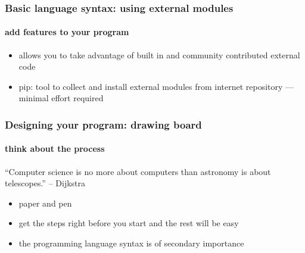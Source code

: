 \documentclass{beamer}
\begin{document}


    \begin{frame}
	    \frametitle{Basic language syntax: using external modules}
	    \framesubtitle{add features to your program}
	    \begin{itemize}
		    \item allows you to take advantage of built in and community contributed external code
		    \item pip: tool to collect and install external modules from internet repository --- minimal effort required
	    \end{itemize}
	    \lstL
	    \lstM
    \end{frame}

    \begin{frame}
	    \frametitle{Designing your program: drawing board}
	    \framesubtitle{think about the process}
	    {
	    \scriptsize
		    ``Computer science is no more about computers than astronomy is about telescopes.''
		    \newline
		    -- Dijkstra
		    }
	    \begin{itemize}
		    \item paper and pen
		    \item get the steps right before you start and the rest will be easy
		    \item the programming language syntax is of secondary importance
	    \end{itemize}
    \end{frame}
\end{document}
